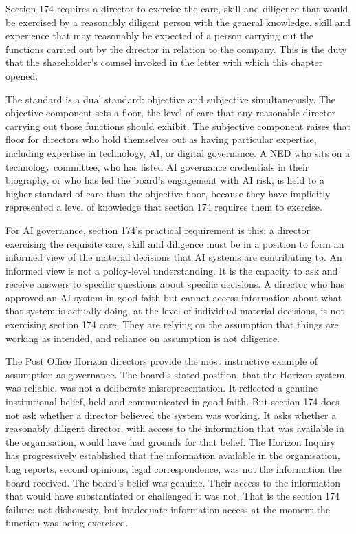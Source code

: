 Section 174 requires a director to exercise the care, skill and diligence that would be exercised by a reasonably diligent person with the general knowledge, skill and experience that may reasonably be expected of a person carrying out the functions carried out by the director in relation to the company. This is the duty that the shareholder's counsel invoked in the letter with which this chapter opened.

The standard is a dual standard: objective and subjective simultaneously. The objective component sets a floor, the level of care that any reasonable director carrying out those functions should exhibit. The subjective component raises that floor for directors who hold themselves out as having particular expertise, including expertise in technology, AI, or digital governance. A NED who sits on a technology committee, who has listed AI governance credentials in their biography, or who has led the board's engagement with AI risk, is held to a higher standard of care than the objective floor, because they have implicitly represented a level of knowledge that section 174 requires them to exercise.

For AI governance, section 174's practical requirement is this: a director exercising the requisite care, skill and diligence must be in a position to form an informed view of the material decisions that AI systems are contributing to. An informed view is not a policy-level understanding. It is the capacity to ask and receive answers to specific questions about specific decisions. A director who has approved an AI system in good faith but cannot access information about what that system is actually doing, at the level of individual material decisions, is not exercising section 174 care. They are relying on the assumption that things are working as intended, and reliance on assumption is not diligence.

The Post Office Horizon directors provide the most instructive example of assumption-as-governance. The board's stated position, that the Horizon system was reliable, was not a deliberate misrepresentation. It reflected a genuine institutional belief, held and communicated in good faith. But section 174 does not ask whether a director believed the system was working. It asks whether a reasonably diligent director, with access to the information that was available in the organisation, would have had grounds for that belief. The Horizon Inquiry has progressively established that the information available in the organisation, bug reports, second opinions, legal correspondence, was not the information the board received. The board's belief was genuine. Their access to the information that would have substantiated or challenged it was not. That is the section 174 failure: not dishonesty, but inadequate information access at the moment the function was being exercised.

